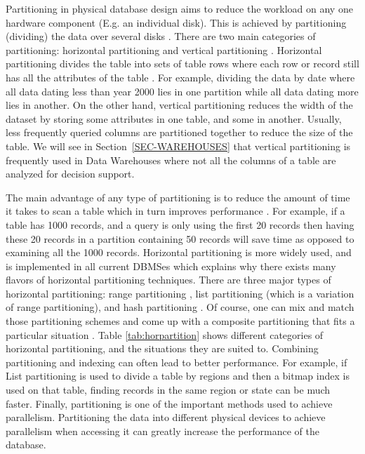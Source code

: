 \documentclass[12pt,a4paper]{article}
\begin{document}
Partitioning in physical database design aims to reduce the workload on any one hardware component (E.g. an individual disk). This is achieved by partitioning
(dividing) the data over several disks \cite{lightstone2007physical}. There are two main categories of partitioning: horizontal partitioning and vertical
partitioning \cite{agrawal2004integrating}. Horizontal partitioning divides the table into sets of table rows where each row or record still has all the
attributes of the table \cite{ceri1982horizontal, shin1985partitioning}. For example, dividing the data by date where all data dating less than year 2000 lies
in one partition while all data dating more lies in another. On the other hand, vertical partitioning reduces the width of the dataset by storing some
attributes in one table, and some in another. Usually, less frequently queried columns are partitioned together to reduce the size of the table. We will see in
Section~\ref{SEC-WAREHOUSES} that vertical partitioning is frequently used in Data Warehouses where not all the columns of a table are analyzed for decision
support.

The main advantage of any type of partitioning is to reduce the amount of time it takes to scan a table which in turn improves performance
\cite{lightstone2007physical}. For example, if a table has 1000 records, and a query is only using the first 20 records then having these 20 records in a
partition containing 50 records will save time as opposed to examining all the 1000 records. Horizontal partitioning is more widely used, and is implemented in
all current DBMSes \cite{mysqlpartitioning, sqlsrvpartitioning, sybasepartitioning, postgrepartitioning, oraclepartitioning, db2partitioning} which explains
why there exists many flavors of horizontal partitioning techniques. There are three major types of horizontal partitioning: range partitioning
\cite{dewitt1986gamma}, list partitioning \cite{lightstone2007physical} (which is a variation of range partitioning), and hash partitioning
\cite{lightstone2007physical}. Of course, one can mix and match those partitioning schemes and come up with a composite partitioning that fits a particular
situation \cite{lightstone2007physical}. Table \ref{tab:horpartition} shows different categories of horizontal partitioning, and the situations they are suited
to. Combining partitioning and indexing can often lead to better performance. For example, if List partitioning is used to divide a table by regions and then a
bitmap index is used on that table, finding records in the same region or state can be much faster. Finally, partitioning is one of the important
methods used to achieve parallelism. Partitioning the data into different physical
devices to achieve parallelism when accessing it can greatly increase the performance of the database.
\end{document}
